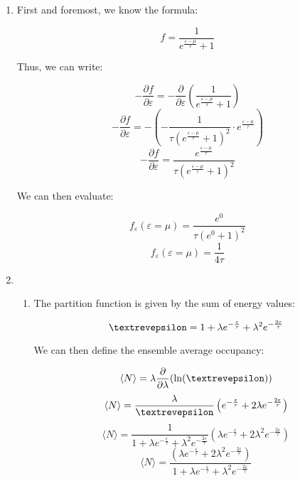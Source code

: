 \begin{enumerate}

  \item

    First and foremost, we know the formula:

    $$f=\frac{1}{e^{\frac{\varepsilon-\mu}{\tau}}+1}$$

    Thus, we can write:

    $$-\frac{\partial f}{\partial \varepsilon}=-\frac{\partial}{\partial \varepsilon}\left( \frac{1}{e^{\frac{\varepsilon-\mu}{\tau}}+1} \right)$$
    $$-\frac{\partial f}{\partial \varepsilon}=-\left( -\frac{1}{\tau \left(e^{\frac{\varepsilon-\mu}{\tau}}+1\right)^2} \cdot e^{\frac{\varepsilon-\mu}{\tau}}\right)$$
    $$-\frac{\partial f}{\partial \varepsilon}=\frac{e^{\frac{\varepsilon-\mu}{\tau}}}{\tau \left(e^{\frac{\varepsilon-\mu}{\tau}}+1\right)^2}$$

    We can then evaluate:

    $$f_\varepsilon(\varepsilon=\mu)=\frac{e^0}{\tau\left( e^0+1 \right)^2}$$
    $$\boxed{f_\varepsilon(\varepsilon=\mu)=\frac{1}{4\tau}}$$

    \setcounter{enumi}{2}

  \item

    \begin{enumerate}

      \item 

        The partition function is given by the sum of energy values:

        $$\text{\textrevepsilon}=1+\lambda e^{-\frac{\varepsilon}{\tau}}+\lambda^2e^{-\frac{2\varepsilon}{\tau}}$$

        We can then define the ensemble average occupancy:

        $$\langle N\rangle=\lambda\frac{\partial}{\partial \lambda}(\ln(\text{\textrevepsilon}))$$
        $$\langle N\rangle=\frac{\lambda}{\text{\textrevepsilon}}\left( e^{-\frac{\varepsilon}{\tau}} + 2\lambda e^{-\frac{2\varepsilon}{\tau}} \right)$$
        $$\langle N\rangle=\frac{1}{1+\lambda e^{-\frac{\varepsilon}{\tau}}+\lambda^2 e^{-\frac{2\varepsilon}{\tau}}}\left(\lambda e^{-\frac{\varepsilon}{\tau}} + 2\lambda^2 e^{-\frac{2\varepsilon}{\tau}} \right)$$
        $$\boxed{\langle N\rangle=\frac{\left(\lambda e^{-\frac{\varepsilon}{\tau}} + 2\lambda^2 e^{-\frac{2\varepsilon}{\tau}} \right)}{1+\lambda e^{-\frac{\varepsilon}{\tau}}+\lambda^2 e^{-\frac{2\varepsilon}{\tau}}}}$$


\end{enumerate}
\end{enumerate}
